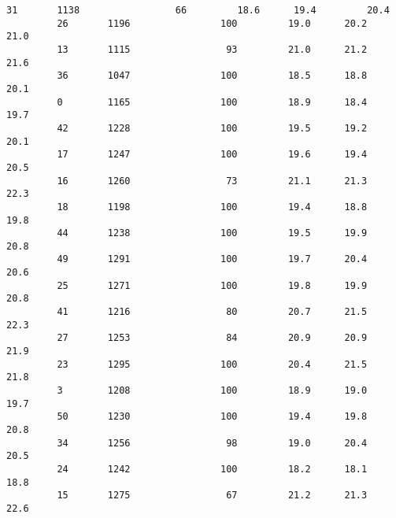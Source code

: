 \documentclass[11pt]{article}
\begin{document}
\begin{Verbatim}[commandchars=\\\{\}]
         31       1138                 66         18.6      19.4         20.4   
         26       1196                100         19.0      20.2         21.0   
         13       1115                 93         21.0      21.2         21.6   
         36       1047                100         18.5      18.8         20.1   
         0        1165                100         18.9      18.4         19.7   
         42       1228                100         19.5      19.2         20.1   
         17       1247                100         19.6      19.4         20.5   
         16       1260                 73         21.1      21.3         22.3   
         18       1198                100         19.4      18.8         19.8   
         44       1238                100         19.5      19.9         20.8   
         49       1291                100         19.7      20.4         20.6   
         25       1271                100         19.8      19.9         20.8   
         41       1216                 80         20.7      21.5         22.3   
         27       1253                 84         20.9      20.9         21.9   
         23       1295                100         20.4      21.5         21.8   
         3        1208                100         18.9      19.0         19.7   
         50       1230                100         19.4      19.8         20.8   
         34       1256                 98         19.0      20.4         20.5   
         24       1242                100         18.2      18.1         18.8   
         15       1275                 67         21.2      21.3         22.6   
         

\end{Verbatim}
\end{document}
